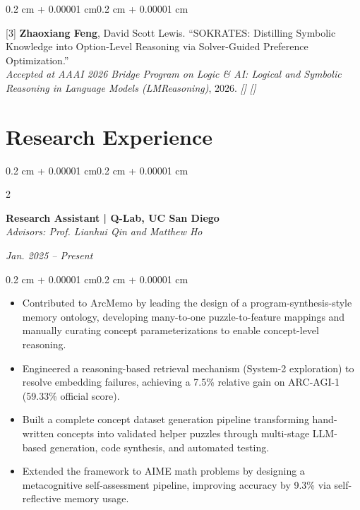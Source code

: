 \documentclass[10pt, letterpaper]{article}
\newenvironment{highlights}{
    \begin{itemize}[
        topsep=0.10 cm,
        parsep=0.10 cm,
        partopsep=0pt,
        itemsep=0pt,
        leftmargin=0.4 cm + 10pt
    ]
}{\end{itemize}}
\newenvironment{onecolentry}{
    \begin{adjustwidth}{0.2 cm + 0.00001 cm}{0.2 cm + 0.00001 cm}
}{\end{adjustwidth}}
\newenvironment{twocolentry}[2][]{
    \onecolentry
    \def\secondColumn{#2}
    \setcolumnwidth{\fill, 4.5 cm}
    \begin{paracol}{2}
}{
    \switchcolumn \raggedleft \secondColumn
    \end{paracol}
    \endonecolentry
}
\let\hrefWithoutArrow\href
\renewcommand{\href}[2]{\hrefWithoutArrow{#1}{\ifthenelse{\equal{#2}{}}{ }{#2}}}
\begin{document}
    \vspace{0.20 cm}

    \begin{onecolentry}
        [3] \textbf{Zhaoxiang Feng}, David Scott Lewis. ``SOKRATES: Distilling Symbolic Knowledge into Option-Level Reasoning via Solver-Guided Preference Optimization.''\\
        \textit{Accepted at AAAI 2026 Bridge Program on Logic \& AI: Logical and Symbolic Reasoning in Language Models (LMReasoning)}, 2026. \hfill \textit{[\href{https://github.com/aaronzhfeng/sokrates-oak/blob/main/paper/sokrates.pdf}{paper}]} \textit{[\href{https://github.com/aaronzhfeng/sokrates-oak}{code}]}
    \end{onecolentry}

    \section{Research Experience}

    \begin{twocolentry}{\textit{Jan. 2025 -- Present}}
        \textbf{Research Assistant | Q-Lab, UC San Diego}\\
        \textit{Advisors: Prof. Lianhui Qin and Matthew Ho}
    \end{twocolentry}
    \vspace{0.10 cm}
    \begin{onecolentry}
        \begin{highlights}
            \item Contributed to ArcMemo by leading the design of a program-synthesis-style memory ontology, developing many-to-one puzzle-to-feature mappings and manually curating concept parameterizations to enable concept-level reasoning.
            \item Engineered a reasoning-based retrieval mechanism (System-2 exploration) to resolve embedding failures, achieving a 7.5\% relative gain on ARC-AGI-1 (59.33\% official score).
            \item Built a complete concept dataset generation pipeline transforming hand-written concepts into validated helper puzzles through multi-stage LLM-based generation, code synthesis, and automated testing.
            \item Extended the framework to AIME math problems by designing a metacognitive self-assessment pipeline, improving accuracy by 9.3\% via self-reflective memory usage.
        \end{highlights}
    \end{onecolentry}
    \vspace{0.20 cm}
\end{document}

